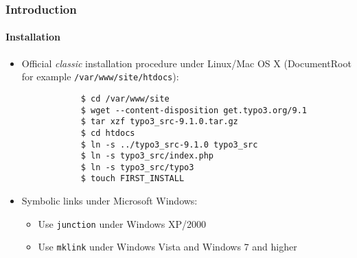 \begin{frame}[fragile]
	\frametitle{Introduction}
	\framesubtitle{Installation}

	\begin{itemize}
		\item Official \textit{classic} installation procedure under Linux/Mac OS X\newline
			(DocumentRoot for example \texttt{/var/www/site/htdocs}):
		\begin{lstlisting}
			$ cd /var/www/site
			$ wget --content-disposition get.typo3.org/9.1
			$ tar xzf typo3_src-9.1.0.tar.gz
			$ cd htdocs
			$ ln -s ../typo3_src-9.1.0 typo3_src
			$ ln -s typo3_src/index.php
			$ ln -s typo3_src/typo3
			$ touch FIRST_INSTALL
		\end{lstlisting}

		\item Symbolic links under Microsoft Windows:

			\begin{itemize}
				\item Use \texttt{junction} under Windows XP/2000
				\item Use \texttt{mklink} under Windows Vista and Windows 7 and higher
			\end{itemize}

	\end{itemize}
\end{frame}

